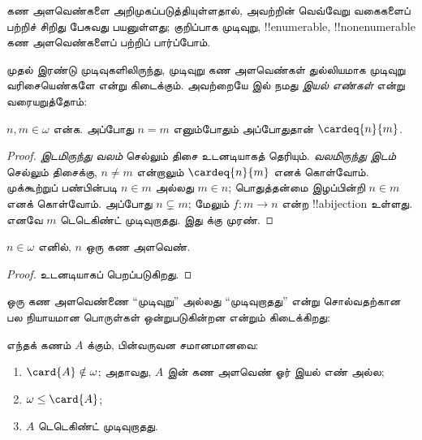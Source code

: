 \documentclass[../../../include/open-logic-section]{subfiles}
\begin{document}

கண அளவெண்களை அறிமுகப்படுத்தியுள்ளதால், அவற்றின் வெவ்வேறு வகைகளைப்
பற்றிச் சிறிது பேசுவது பயனுள்ளது; குறிப்பாக முடிவுறு, !!{enumerable},
!!{nonenumerable} கண அளவெண்களைப் பற்றிப் பார்ப்போம்.

முதல் இரண்டு முடிவுகளிலிருந்து, முடிவுறு கண அளவெண்கள் துல்லியமாக
முடிவுறு வரிசையெண்களே என்று கிடைக்கும். அவற்றையே
 இல் நமது \emph{இயல் எண்கள்}
என்று வரையறுத்தோம்:

\begin{prop}
$n, m \in \omega$ என்க. அப்போது $n = m$ எனும்போதும் அப்போதுதான்
$\cardeq{n}{m}$.
\end{prop}

\begin{proof}
\emph{இடமிருந்து வலம்} செல்லும் திசை உடனடியாகத் தெரியும்.
\emph{வலமிருந்து இடம்} செல்லும் திசைக்கு, $n \neq m$ என்றாலும்
$\cardeq{n}{m}$ எனக் கொள்வோம். முக்கூற்றுப் பண்பின்படி $n \in m$
அல்லது $m \in n$; பொதுத்தன்மை இழப்பின்றி $n \in m$ எனக் கொள்வோம்.
அப்போது $n \subsetneq m$; மேலும் $f \colon m \to n$ என்ற
!!a{bijection} உள்ளது. எனவே $m$ டெடெகிண்ட் முடிவுறாதது.
இது  க்கு முரண்.
\end{proof}

\begin{cor}
$n \in \omega$ எனில், $n$ ஒரு கண அளவெண்.
\end{cor}

\begin{proof}
உடனடியாகப் பெறப்படுகிறது.
\end{proof}
\noindent

ஒரு கண அளவெண்ணை ``முடிவுறு'' அல்லது ``முடிவுறாதது'' என்று
சொல்வதற்கான பல நியாயமான பொருள்கள் ஒன்றுபடுகின்றன என்றும் கிடைக்கிறது:
\begin{thm}எந்தக் கணம் $A$ க்கும்,
பின்வருவன சமானமானவை:
\begin{enumerate}
	\item{} $\card{A} \notin \omega$;
	அதாவது, $A$ இன் கண அளவெண் ஓர் இயல் எண் அல்ல;
	\item{} $\omega \leq \card{A}$;
	\item{} $A$ டெடெகிண்ட் முடிவுறாதது.
\end{enumerate}
\end{thm}
\end{document}
